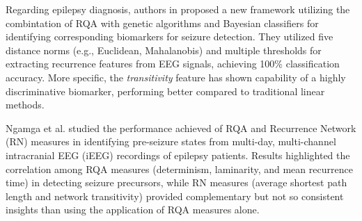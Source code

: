\documentclass{article}
\begin{document}
			Regarding epilepsy diagnosis, authors in \cite{palanisamy2024} proposed a new framework 
			utilizing the combintation of RQA with genetic algorithms and Bayesian classifiers for 
			identifying corresponding biomarkers for seizure detection. 
			They utilized five distance norms (e.g., Euclidean, Mahalanobis) and multiple thresholds 
			for extracting recurrence features from EEG signals, achieving 100\% classification accuracy. 
			More specific, the \textit{transitivity} feature has shown capability of a highly discriminative biomarker, 
			performing better compared to traditional linear methods. 

			Ngamga et al.\cite{ngamga2016} studied the performance achieved of RQA and Recurrence Network (RN) measures in identifying 
			pre-seizure states from multi-day, multi-channel intracranial EEG (iEEG) 
			recordings of epilepsy patients. 
			Results highlighted the correlation among RQA measures (determinism, laminarity, and mean recurrence time) in 
			detecting seizure precursors, while RN measures (average shortest path length and network transitivity) provided 
			complementary but not so consistent insights than using the application of RQA measures alone.
\end{document}
